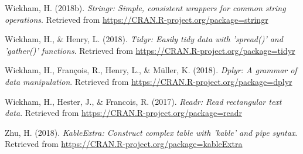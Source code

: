 \documentclass[man]{apa6}
\begin{document}
\hypertarget{ref-R-stringr}{}
Wickham, H. (2018b). \emph{Stringr: Simple, consistent wrappers for
common string operations}. Retrieved from
\url{https://CRAN.R-project.org/package=stringr}

\hypertarget{ref-R-tidyr}{}
Wickham, H., \& Henry, L. (2018). \emph{Tidyr: Easily tidy data with
'spread()' and 'gather()' functions}. Retrieved from
\url{https://CRAN.R-project.org/package=tidyr}

\hypertarget{ref-R-dplyr}{}
Wickham, H., François, R., Henry, L., \& Müller, K. (2018). \emph{Dplyr:
A grammar of data manipulation}. Retrieved from
\url{https://CRAN.R-project.org/package=dplyr}

\hypertarget{ref-R-readr}{}
Wickham, H., Hester, J., \& Francois, R. (2017). \emph{Readr: Read
rectangular text data}. Retrieved from
\url{https://CRAN.R-project.org/package=readr}

\hypertarget{ref-R-kableExtra}{}
Zhu, H. (2018). \emph{KableExtra: Construct complex table with 'kable'
and pipe syntax}. Retrieved from
\url{https://CRAN.R-project.org/package=kableExtra}

\endgroup
\end{document}
